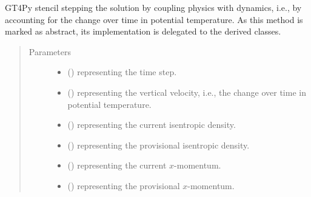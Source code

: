 \documentclass[letterpaper,10pt,english]{sphinxmanual}
\begin{document}
\begin{fulllineitems}
\begin{fulllineitems}
\label{\detokenize{api:tasmania.dycore.prognostic_isentropic.PrognosticIsentropic._stencil_stepping_by_coupling_physics_with_dynamics_defs}}
GT4Py stencil stepping the solution by coupling physics with dynamics, i.e., by accounting for the
change over time in potential temperature.
As this method is marked as abstract, its implementation is delegated to the derived classes.
\begin{quote}\begin{description}
\item[{Parameters}] \leavevmode\begin{itemize}
\item {} 
 () \textendash{}  representing the time step.

\item {} 
 () \textendash{}  representing the vertical velocity, i.e., the change over time in potential temperature.

\item {} 
 () \textendash{}  representing the current isentropic density.

\item {} 
 () \textendash{}  representing the provisional isentropic density.

\item {} 
 () \textendash{}  representing the current \(x\)-momentum.

\item {} 
 () \textendash{}  representing the provisional \(x\)-momentum.


\end{itemize}
\end{description}
\end{quote}
\end{fulllineitems}
\end{fulllineitems}
\end{document}
